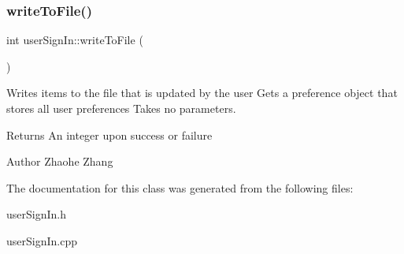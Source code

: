\subsubsection{\texorpdfstring{write\+To\+File()}{writeToFile()}}
{\footnotesize\ttfamily int user\+Sign\+In\+::write\+To\+File (\begin{DoxyParamCaption}{ }\end{DoxyParamCaption})}



Writes items to the file that is updated by the user  Gets a preference object that stores all user preferences  Takes no parameters. 

\begin{DoxyReturn}{Returns}
An integer upon success or failure 
\end{DoxyReturn}
\begin{DoxyAuthor}{Author}
Zhaohe Zhang 
\end{DoxyAuthor}


The documentation for this class was generated from the following files\+:\begin{DoxyCompactItemize}
\item 
user\+Sign\+In.\+h\item 
user\+Sign\+In.\+cpp\end{DoxyCompactItemize}
